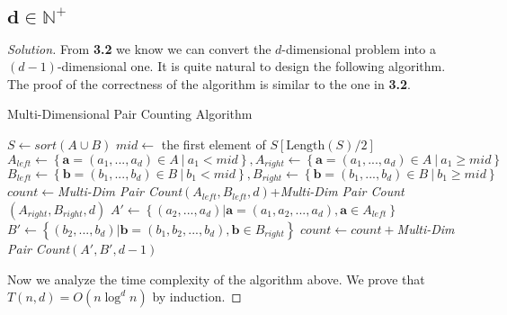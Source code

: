 \documentclass{article}
\newenvironment{solution}{\begin{proof}[\noindent\it Solution]}{\end{proof}}
\begin{document}
\vspace{1em}
\subsection{$\boldsymbol{d\in\mathbb{N^+}}$}
\vspace{1em}
\begin{solution}
    From \textbf{3.2} we know we can convert the $d$-dimensional problem into a $(d-1)$-dimensional one. It is quite natural to design the following algorithm. The proof of the correctness of the algorithm is similar to the one in \textbf{3.2}.
    
    \begin{algorithm}
        \caption{Multi-Dimensional Pair Counting Algorithm}
        
	    {
	        \BlankLine
	        \BlankLine
	        \BlankLine
	        \BlankLine
	        \BlankLine
	        \BlankLine
	        $S \gets sort\left(A\cup B\right)$\;
	        $mid \gets$ the first element of $S[\mathrm{Length}(S)/2]$\;
	        $A_{left}\gets\left\{\boldsymbol{a}=(a_1,...,a_d)\in A\ \big|\ a_1<mid\right\}, A_{right}\gets\left\{\boldsymbol{a}=(a_1,...,a_d)\in A\ \big|\ a_1\geq mid\right\}$\;
	        $B_{left}\gets\left\{\boldsymbol{b}=(b_1,...,b_d)\in B\ \big|\ b_1<mid\right\},
	        B_{right}\gets\left\{\boldsymbol{b}=(b_1,...,b_d)\in B\ \big|\ b_1\geq mid\right\}$\;
	        \BlankLine
	        \BlankLine
	        \BlankLine
	        $count\gets$\textit{Multi-Dim Pair Count}$(A_{left},B_{left},d)$+\textit{Multi-Dim Pair Count}$(A_{right},B_{right},d)$\;
	        $A'\gets\left\{(a_2,...,a_d)\big|\boldsymbol{a}=(a_1,a_2,...,a_d),\boldsymbol{a}\in A_{left}\right\}$\; $B'\gets\left\{(b_2,...,b_d)\big|\boldsymbol{b}=(b_1,b_2,...,b_d),\boldsymbol{b}\in B_{right}\right\}$\;
	        $count\gets count+$\textit{Multi-Dim Pair Count}$(A',B',d-1)$\;
	    }
    \end{algorithm}
    
    \hspace{1.3em}
    Now we analyze the time complexity of the algorithm above. We prove that $T(n,d)=O(n\log^dn)$ by induction.
    

\end{solution}
\end{document}
